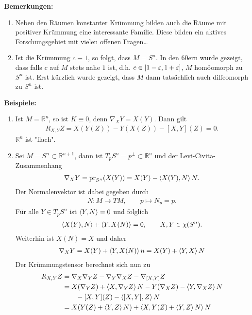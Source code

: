\documentclass[12pt,a4paper]{article}
\def\R{\mathbb{R}}
\def\pr{\mathrm{pr}}
\begin{document}
\bigskip


{\bf Bemerkungen:}
\begin{enumerate}
  \item Neben den R\"aumen konstanter Kr\"ummung bilden auch die R\"aume mit positiver
  Kr\"ummung eine interessante Familie. Diese bilden ein aktives Forschungsgebiet
  mit vielen offenen Fragen\ldots
  \item Ist die Kr\"ummung $c\equiv 1$, so folgt, dass $M=S^n$. In den 60ern wurde
  gezeigt, dass falls $c$ auf $M$ stets nahe $1$ ist, d.h. $c\in
  [1-\varepsilon,1+\varepsilon]$, $M$ hom\"oomorph zu $S^n$ ist. Erst k\"urzlich wurde gezeigt,
  dass $M$ dann tats\"achlich auch diffeomorph zu $S^n$ ist.
\end{enumerate}

\bigskip

{\bf Beispiele:}
\begin{enumerate}
  \item Ist $M=\R^n$, so ist $K\equiv 0$, denn $\nabla_X Y = X(Y)$. Dann gilt
\begin{align*}
R_{X,Y}Z = X(Y(Z)) - Y(X(Z)) - [X,Y](Z) = 0.
\end{align*}
$\R^n$ ist "flach".
\item Sei $M=S^n\subset\R^{n+1}$, dann ist $T_pS^n = p^\bot\subset\R^n$ und
der Levi-Civita-Zusammenhang
\begin{align*}
\nabla_X Y=\pr_{S^n}(X(Y)) = X(Y)-\scp{X(Y),N}N.
\end{align*}
Der Normalenvektor ist dabei gegeben durch
\begin{align*}
N: M\to TM,\qquad p\mapsto N_p = p.
\end{align*}
F\"ur alle $Y\in T_pS^n$ ist $\left\langle Y,N\right\rangle = 0$ und folglich
\begin{align*}
\left\langle X(Y),N\right\rangle + \left\langle Y,X(N)\right\rangle = 0,\qquad X,Y\in\chi(S^n).
\end{align*}
Weiterhin ist $X(N) = X$ und daher
\begin{align*}
\nabla_X Y = X(Y) + \left\langle Y,X(N)\right\rangle n = X(Y) + \left\langle Y,X\right\rangle N
\end{align*}
Der Kr\"ummungstensor berechnet sich nun zu
\begin{align*}
R_{X,Y}Z &= \nabla_X\nabla_Y Z - \nabla_Y\nabla_X Z - \nabla_{[X,Y]}Z\\
&= X(\nabla_Y Z) + \scp{X, \nabla_YZ}N - 
Y(\nabla_X Z) - \scp{Y,\nabla_XZ}N\\
&\qquad- [X,Y](Z) - \scp{[X,Y],Z}N\\
&= X(Y(Z) + \scp{Y,Z}N) + \scp{X,Y(Z)+\scp{Y,Z}N}N\\

\end{align*}
\end{enumerate}
\end{document}
